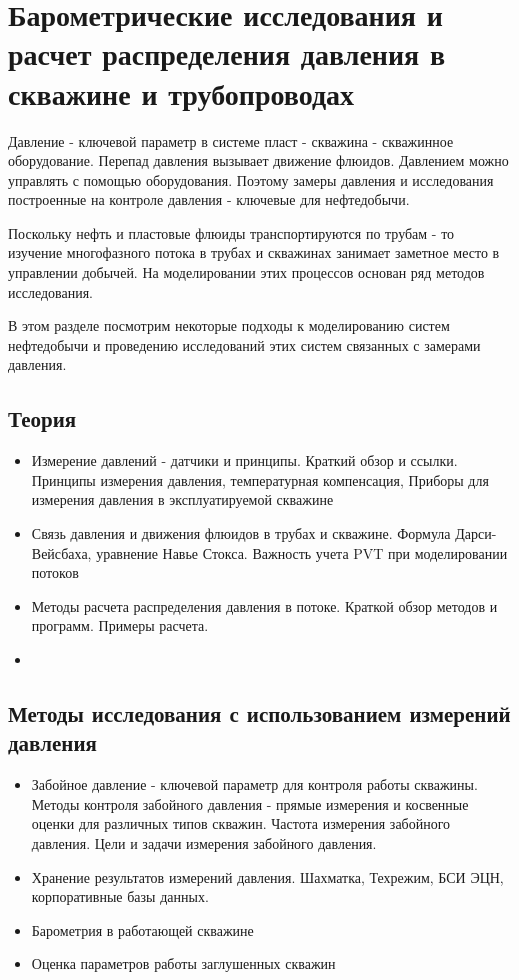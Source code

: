 \section{Барометрические исследования и расчет распределения давления в скважине и трубопроводах}

Давление - ключевой параметр в системе пласт - скважина - скважинное оборудование. Перепад давления вызывает движение флюидов. Давлением можно управлять с помощью оборудования. Поэтому замеры давления и исследования построенные на контроле давления - ключевые для нефтедобычи.

Поскольку нефть и пластовые флюиды транспортируются по трубам - то изучение многофазного потока в трубах и скважинах занимает заметное место в управлении добычей. На моделировании этих процессов основан ряд методов исследования. 

В этом разделе посмотрим некоторые подходы к моделированию систем нефтедобычи и проведению исследований этих систем связанных с замерами давления.

\subsection{Теория}
\begin{itemize}
    \item Измерение давлений - датчики и принципы. Краткий обзор и ссылки. Принципы измерения давления, температурная компенсация, Приборы для измерения давления в эксплуатируемой скважине
    \item Связь давления и движения флюидов в трубах и скважине. Формула Дарси-Вейсбаха, уравнение Навье Стокса. Важность учета PVT при моделировании потоков
    \item Методы расчета распределения давления в потоке. Краткой обзор методов и программ. Примеры расчета.
    \item 
\end{itemize}

\subsection{Методы исследования с использованием измерений давления}
\begin{itemize}
    \item Забойное давление - ключевой параметр для контроля работы скважины. Методы контроля забойного давления - прямые измерения и косвенные оценки для различных типов скважин. Частота измерения забойного давления. Цели и задачи измерения забойного давления.
    \item Хранение результатов измерений давления. Шахматка, Техрежим, БСИ ЭЦН, корпоративные базы данных.
    \item Барометрия в работающей скважине
    \item Оценка параметров работы заглушенных скважин
\end{itemize}

